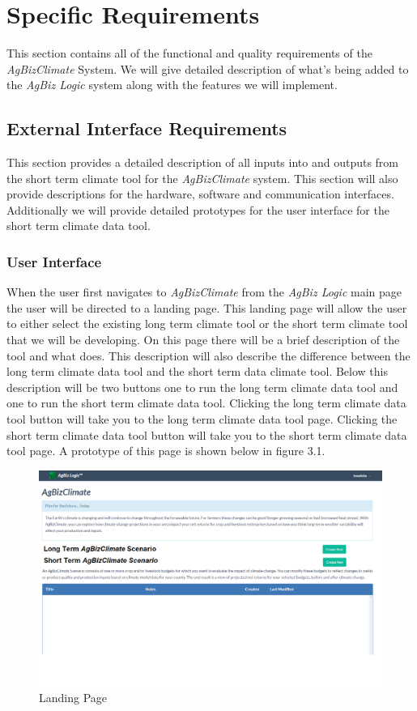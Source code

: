 \documentclass[onecolumn, draftclsnofoot,10pt, compsoc]{article}
\begin{document}
\section{Specific Requirements}
This section contains all of the functional and quality requirements of the \textit{AgBizClimate} System. We will give detailed description of what's being added to the \textit{AgBiz Logic} system along with the features we will implement.\\
    \subsection{External Interface Requirements}
		This section provides a detailed description of all inputs into and outputs from the short term climate tool for the \textit{AgBizClimate} system. This section will also provide descriptions for the hardware, software and communication interfaces. Additionally we will provide detailed prototypes for the user interface for the short term climate data tool.\\
        \subsubsection{User Interface}
					When the user first navigates to \textit{AgBizClimate} from the \textit{AgBiz Logic} main page the user will be directed to a landing page. This landing page will allow the user to either select the existing long term climate tool or the short term climate tool that we will be developing. On this page there will be a brief description of the tool and what does. This description will also describe the difference between the long term climate data tool and the short term data climate tool. Below this description will be two buttons one to run the long term climate data tool and one to run the short term climate data tool. Clicking the long term climate data tool button will take you to the long term climate data tool page. Clicking the short term climate data tool button will take you to the short term climate data tool page. A prototype of this page is shown below in figure 3.1.\\
					\begin{figure}
						\includegraphics[width=\linewidth]{Figures/LandingPage.PNG}
						\caption{Landing Page}
						\label{figure3.1}
					\end{figure}
					
\end{document}
